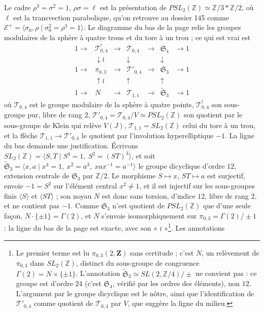 \documentclass[11pt,a4paper]{article}
\begin{document}
Le cadre $\rho^3 = \sigma^2 = 1$, $\rho\sigma = \ell$ est la présentation de
$PSL_2(\mathbb{Z}) \simeq \mathbb{Z}/3 * \mathbb{Z}/2$, où $\ell$ est la
transvection parabolique, qu'on retrouve au dossier 145 comme $\mathcal{E}^{+}
= \langle \sigma_0, \rho \mid \sigma_0^2 = \rho^3 = 1 \rangle$. Le diagramme
du bas de la page relie les groupes modulaires de la sphère à quatre trous et
du tore à un trou ; ce qui est vrai est
\[
\begin{array}{ccccccccc}
1 \to & \mathcal{T}^{!}_{0,4} & \to & \mathcal{T}_{0,4} & \to & \mathfrak{S}_4 & \to 1 \\
 & \downarrow{\scriptstyle\wr} & & \downarrow & & \downarrow & \\
1 \to & \pi_{0,3} & \to & \mathcal{T}'_{0,4} & \to & \mathfrak{S}_3 & \to 1 \\
 & \uparrow{\scriptstyle\wr} & & \uparrow & & \uparrow & \\
1 \to & N & \to & \mathcal{T}_{1,1} & \to & \widetilde{\mathfrak{S}}_3 & \to 1
\end{array}
\]
où $\mathcal{T}_{0,4}$ est le groupe modulaire de la sphère à quatre points,
$\mathcal{T}^{!}_{0,4}$ son sous-groupe pur, libre de rang $2$, $\mathcal{T}'_{0,4}
= \mathcal{T}_{0,4}/V \simeq PSL_2(\mathbb{Z})$ son quotient par le sous-groupe de
Klein qui relève $V(J)$, $\mathcal{T}_{1,1} = SL_2(\mathbb{Z})$ celui du tore à
un trou, et la flèche $\mathcal{T}_{1,1} \to \mathcal{T}'_{0,4}$ le quotient par
l'involution hyperelliptique $-1$. La ligne du bas demande une justification. Écrivons
$SL_2(\mathbb{Z}) = \langle S, T \mid S^4 = 1,\ S^2 = (ST)^3 \rangle$, et soit
$\widetilde{\mathfrak{S}}_3 = \langle x, a \mid x^4 = 1,\ x^2 = a^3,\ x a x^{-1}
= a^{-1} \rangle$ le groupe dicyclique d'ordre $12$, extension centrale de
$\mathfrak{S}_3$ par $\mathbb{Z}/2$. Le morphisme $S \mapsto x$, $ST \mapsto a$
est surjectif, envoie $-1 = S^2$ sur l'élément central $x^2 \neq 1$, et il est
injectif sur les sous-groupes finis $\langle S \rangle$ et $\langle ST \rangle$ ;
son noyau $N$ est donc sans torsion, d'indice $12$, libre de rang $2$, et ne
contient pas $-1$. Comme $\mathfrak{S}_3$ n'est quotient de $PSL_2(\mathbb{Z})$
que d'une seule façon, $N \cdot \{\pm 1\} = \Gamma(2)$, et $N$ s'envoie
isomorphiquement sur $\pi_{0,3} = \Gamma(2)/\pm 1$ : la ligne du bas de la page
est exacte, avec son « $\wr$ »\footnote{Le premier terme est lu
$\pi_{0,3}(2, \mathbf{Z})$ sans certitude ; c'est $N$, un relèvement de
$\pi_{0,3}$ dans $SL_2(\mathbb{Z})$, distinct du sous-groupe de congruence
$\Gamma(2) = N \times \{\pm 1\}$. L'annotation $\widetilde{\mathfrak{S}}_3
\simeq SL(2, \mathbb{Z}/4)/\pm$ ne convient pas : ce groupe est d'ordre $24$
(c'est $\mathfrak{S}_4$, vérifié par les ordres des éléments), non $12$.
L'argument par le groupe dicyclique est le nôtre, ainsi que l'identification de
$\mathcal{T}'_{0,4}$ comme quotient de $\mathcal{T}_{0,4}$ par $V$, que suggère la
ligne du milieu.}. Les annotations
\end{document}
